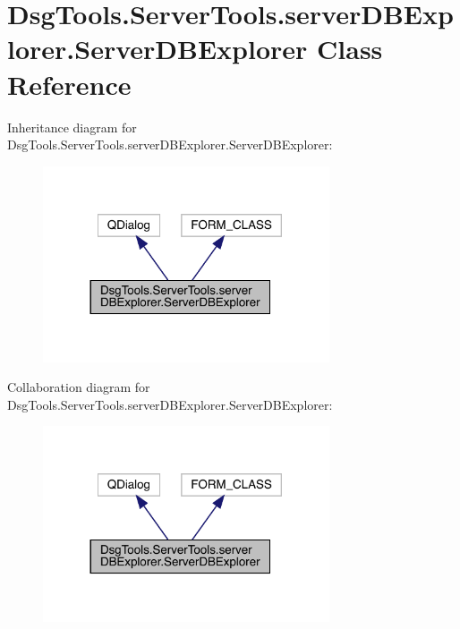 \hypertarget{class_dsg_tools_1_1_server_tools_1_1server_d_b_explorer_1_1_server_d_b_explorer}{}\section{Dsg\+Tools.\+Server\+Tools.\+server\+D\+B\+Explorer.\+Server\+D\+B\+Explorer Class Reference}
\label{class_dsg_tools_1_1_server_tools_1_1server_d_b_explorer_1_1_server_d_b_explorer}


Inheritance diagram for Dsg\+Tools.\+Server\+Tools.\+server\+D\+B\+Explorer.\+Server\+D\+B\+Explorer\+:
\nopagebreak
\begin{figure}[H]
\begin{center}
\leavevmode
\includegraphics[width=240pt]{class_dsg_tools_1_1_server_tools_1_1server_d_b_explorer_1_1_server_d_b_explorer__inherit__graph}
\end{center}
\end{figure}


Collaboration diagram for Dsg\+Tools.\+Server\+Tools.\+server\+D\+B\+Explorer.\+Server\+D\+B\+Explorer\+:
\nopagebreak
\begin{figure}[H]
\begin{center}
\leavevmode
\includegraphics[width=240pt]{class_dsg_tools_1_1_server_tools_1_1server_d_b_explorer_1_1_server_d_b_explorer__coll__graph}
\end{center}
\end{figure}
